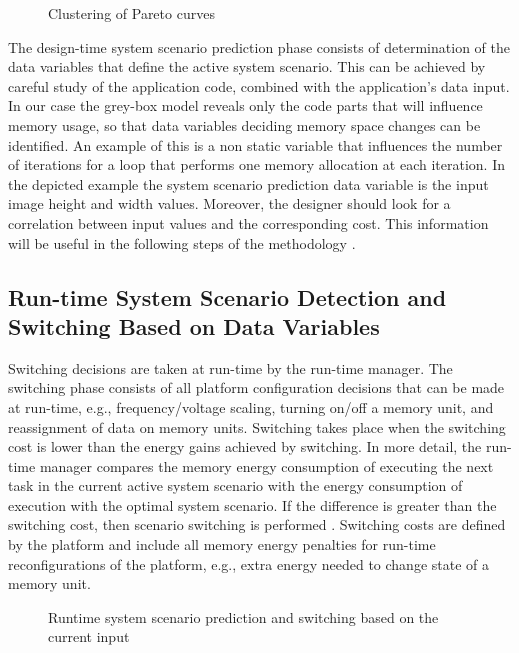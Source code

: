 \documentclass{acm_proc_article-sp}
\begin{document}
\begin{figure}[!t]
\centering
\caption{Clustering of Pareto curves}
\label{fig:pareto}
\end{figure}

The design-time system scenario prediction phase consists of determination of the data variables that define the active system scenario. This can be achieved by careful study of the application code, combined with the application's data input. In our case the grey-box model reveals only the code parts that will influence memory usage, so that data variables deciding memory space changes can be identified. An example of this is a non static variable that influences the number of iterations for a loop that performs one memory allocation at each iteration. In the depicted example the system scenario prediction data variable is the input image height and width values. Moreover, the designer should look for a correlation between input values and the corresponding cost. This information will be useful in the following steps of the methodology \cite{tcm}.

\subsection{Run-time System Scenario Detection and Switching Based on Data Variables}

Switching decisions are taken at run-time by the run-time manager. The switching phase consists of all platform configuration decisions that can be made at run-time, e.g., frequency/voltage scaling, turning on/off a memory unit, and reassignment of data on memory units. Switching takes place when the switching cost is lower than the energy gains achieved by switching. In more detail, the run-time manager compares the memory energy consumption of executing the next task in the current active system scenario with the energy consumption of execution with the optimal system scenario. If the difference is greater than the switching cost, then scenario switching is performed \cite{tcm}. Switching costs are defined by the platform and include all memory energy penalties for run-time reconfigurations of the platform, e.g., extra energy needed to change state of a memory unit.

\begin{figure}[!t]
\centering
\caption{Runtime system scenario prediction and switching based on the current input}
\label{fig:runtime}
\end{figure}
\end{document}
